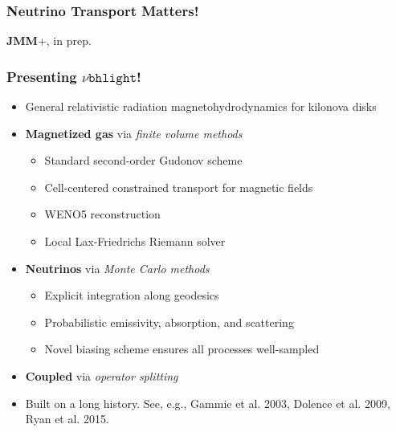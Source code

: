 \documentclass[]{beamer}
\begin{document}
\begin{frame}
  \frametitle{Neutrino Transport Matters!}
  \begin{center}
  \end{center}
  \textbf{JMM}+, in prep.
\end{frame}

\begin{frame}
  \frametitle{Presenting $\nu\texttt{bhlight}$!}
  \begin{itemize}
  \item General relativistic radiation magnetohydrodynamics for kilonova disks
  \item \textbf{Magnetized gas} via \textit{finite volume methods}
    \begin{itemize}
    \item Standard second-order Gudonov scheme
    \item Cell-centered constrained transport for magnetic fields
    \item WENO5 reconstruction
    \item Local Lax-Friedrichs Riemann solver
    \end{itemize}
  \item \textbf{Neutrinos} via \textit{Monte Carlo methods}
    \begin{itemize}
    \item Explicit integration along geodesics
    \item Probabilistic emissivity, absorption, and scattering
    \item Novel biasing scheme ensures all processes well-sampled
    \end{itemize}
  \item \textbf{Coupled} via \textit{operator splitting}
  \item Built on a long history. See, e.g., Gammie et al. 2003,
    Dolence et al. 2009, Ryan et al. 2015.
  \end{itemize}
\end{frame}
\end{document}

